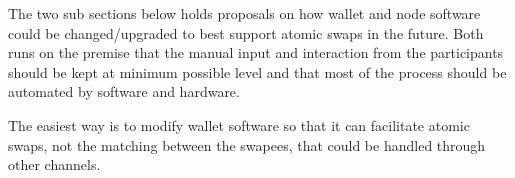 The two sub sections below holds proposals on how wallet and node software could be changed/upgraded to best support atomic swaps in the future. Both runs on the premise that the manual input and interaction from the participants should be kept at minimum possible level and that most of the process should be automated by software and hardware.

The easiest way is to modify wallet software so that it can facilitate atomic swaps, not the matching between the swapees, that could be handled  through other channels. 

